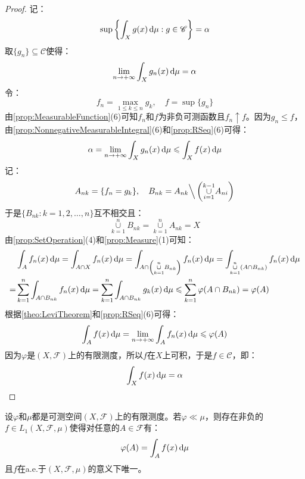 \begin{proof}
	记：
	\begin{equation*}
		\sup\left\{\int_{X}g(x)\mathop{}\!\mathrm{d}\mu:g\in\mathscr{C}\right\}=\alpha
	\end{equation*}
	取$\{g_n\}\subseteq\mathscr{C}$使得：
	\begin{equation*}
		\lim_{n\to+\infty}\int_{X}g_n(x)\mathop{}\!\mathrm{d}\mu=\alpha
	\end{equation*}
	令：
	\begin{equation*}
		f_n=\max_{1\leqslant k\leqslant n}g_k,\quad f=\sup\{g_n\}
	\end{equation*}
	由\cref{prop:MeasurableFunction}(6)可知$f_n$和$f$为非负可测函数且$f_n\uparrow f$。因为$g_n\leqslant f$，由\cref{prop:NonnegativeMeasurableIntegral}(6)和\cref{prop:RSeq}(6)可得：
	\begin{equation*}
		\alpha=\lim_{n\to+\infty}\int_{X}g_n(x)\mathop{}\!\mathrm{d}\mu\leqslant\int_{X}f(x)\mathop{}\!\mathrm{d}\mu
	\end{equation*}
	记：
	\begin{equation*}
		A_{nk}=\{f_n=g_k\},\quad B_{nk}=A_{nk}\Big\backslash\left(\underset{i=1}{\overset{k-1}{\cup}}A_{ni}\right)
	\end{equation*}
	于是$\{B_{nk}:k=1,2,\dots,n\}$互不相交且：
	\begin{equation*}
		\underset{k=1}{\overset{n}{\cup}}B_{nk}=\underset{k=1}{\overset{n}{\cup}}A_{nk}=X
	\end{equation*}
	由\cref{prop:SetOperation}(4)和\cref{prop:Measure}(1)可知：
	\begin{align*}
		&\int_{A}f_n(x)\mathop{}\!\mathrm{d}\mu=\int_{A\cap X}f_n(x)\mathop{}\!\mathrm{d}\mu=\int_{A\cap\left(\underset{k=1}{\overset{n}{\cup}}B_{nk}\right)}f_n(x)\mathop{}\!\mathrm{d}\mu=\int_{\underset{k=1}{\overset{n}{\cup}}(A\cap B_{nk})}f_n(x)\mathop{}\!\mathrm{d}\mu \\
		=&\sum_{k=1}^{n}\int_{A\cap B_{nk}}f_n(x)\mathop{}\!\mathrm{d}\mu=\sum_{k=1}^{n}\int_{A\cap B_{nk}}g_k(x)\mathop{}\!\mathrm{d}\mu\leqslant\sum_{k=1}^{n}\varphi(A\cap B_{nk})=\varphi(A)
	\end{align*}
	根据\cref{theo:LeviTheorem}和\cref{prop:RSeq}(6)可得：
	\begin{equation*}
		\int_{A}f(x)\mathop{}\!\mathrm{d}\mu=\lim_{n\to+\infty}\int_{A}f_n(x)\mathop{}\!\mathrm{d}\mu\leqslant\varphi(A)
	\end{equation*}
	因为$\varphi$是$(X,\mathscr{F})$上的有限测度，所以$f$在$X$上可积，于是$f\in\mathscr{C}$，即：
	\begin{equation*}
		\int_{X}f(x)\mathop{}\!\mathrm{d}\mu=\alpha\qedhere
	\end{equation*}
\end{proof}
\begin{lemma}\label{lem:RadonNikodym2}
	设$\varphi$和$\mu$都是可测空间$(X,\mathscr{F})$上的有限测度。若$\varphi\ll\mu$，则存在非负的$f\in L_1(X,\mathscr{F},\mu)$使得对任意的$A\in\mathscr{F}$有：
	\begin{equation*}
		\varphi(A)=\int_{A}f(x)\mathop{}\!\mathrm{d}\mu
	\end{equation*}
	且$f$在a.e.于$(X,\mathscr{F},\mu)$的意义下唯一。
\end{lemma}
